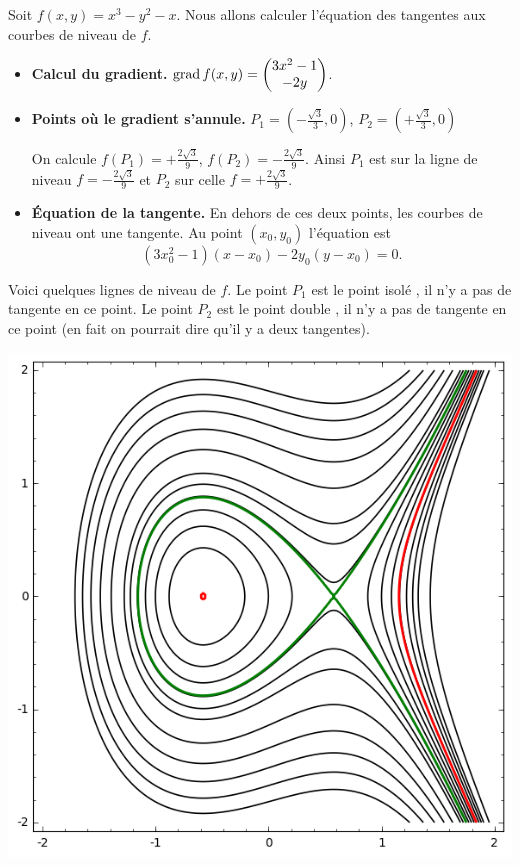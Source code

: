 \documentclass[12pt, class=report,crop=false]{standalone}
\begin{document}
\begin{exemple}
Soit $f(x,y) = x^3-y^2-x$.
Nous allons calculer l'équation des tangentes aux courbes de niveau de $f$.

\begin{itemize}
  \item \textbf{Calcul du gradient.}  
  $\operatorname{grad} f(x,y) = \begin{pmatrix} 3x^2-1 \\ -2y \end{pmatrix}$.
  
  \item \textbf{Points où le gradient s'annule.} 
  $P_1 = \left( -\frac{\sqrt 3}{3},0 \right)$, $P_2 =\left( +\frac{\sqrt 3}{3},0 \right)$
  
  On calcule $f(P_1) = +\frac{2\sqrt3}{9}$, $f(P_2) = -\frac{2\sqrt3}{9}$. Ainsi $P_1$ est sur la ligne de niveau $f=-\frac{2\sqrt3}{9}$ et $P_2$ sur celle $f=+\frac{2\sqrt3}{9}$.
   
  \item \textbf{\'Equation de la tangente.}  
  En dehors de ces deux points, les courbes de niveau ont une tangente.
  Au point $(x_0,y_0)$ l'équation est 
  $$(3x_0^2-1)(x-x_0) -2y_0(y-x_0) = 0.$$
\end{itemize}  


Voici quelques lignes de niveau de $f$.
Le point $P_1$ est le point isolé , il n'y a pas de tangente en ce point. Le point $P_2$ est le point double , il n'y a pas de tangente en ce point (en fait on pourrait dire qu'il y a deux tangentes).




\begin{center}
  \includegraphics{figures/fig-gradient-04}
\end{center}

\end{exemple}
\end{document}
